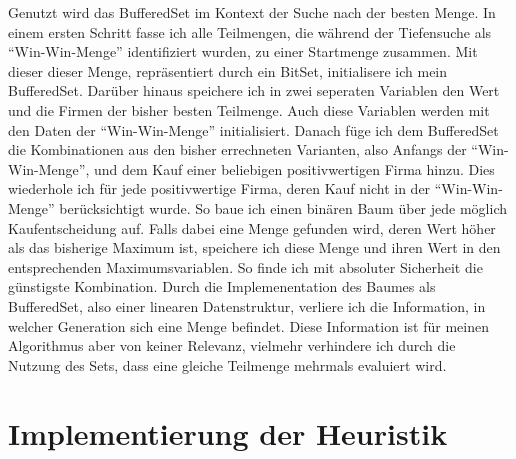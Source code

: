 Genutzt wird das BufferedSet im Kontext der Suche nach der besten Menge. In einem ersten Schritt fasse ich alle Teilmengen, die während der Tiefensuche als "`Win-Win-Menge"' identifiziert wurden, zu einer Startmenge zusammen. Mit dieser dieser Menge, repräsentiert durch ein BitSet, initialisere ich mein BufferedSet. Darüber hinaus speichere ich in zwei seperaten Variablen den Wert und die Firmen der bisher besten Teilmenge. Auch diese Variablen werden mit den Daten der "`Win-Win-Menge"' initialisiert. 
Danach füge ich dem BufferedSet die Kombinationen aus den bisher errechneten Varianten, also Anfangs der "`Win-Win-Menge"', und dem Kauf einer beliebigen positivwertigen Firma hinzu. Dies wiederhole ich für jede positivwertige Firma, deren Kauf nicht in der "`Win-Win-Menge"' berücksichtigt wurde. So baue ich einen binären Baum über jede möglich Kaufentscheidung auf. Falls dabei eine Menge gefunden wird, deren Wert höher als das bisherige Maximum ist, speichere ich diese Menge und ihren Wert in den entsprechenden Maximumsvariablen. So finde ich mit absoluter Sicherheit die günstigste Kombination. Durch die Implemenentation des Baumes als BufferedSet, also einer linearen Datenstruktur, verliere ich die Information, in welcher Generation sich eine Menge befindet. Diese Information ist für meinen Algorithmus aber von keiner Relevanz, vielmehr verhindere ich durch die Nutzung des Sets, dass eine gleiche Teilmenge mehrmals evaluiert wird.

\section{Implementierung der Heuristik}